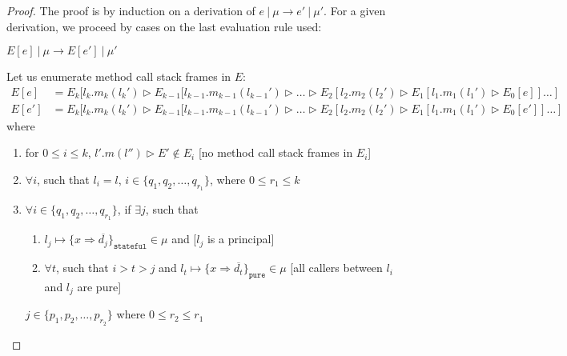 \documentclass{llncs}
\newcommand{\keywadj}[1]{\mathtt{#1}}
\newcommand{\intuition}[1]{#1}
\begin{document}
\begin{proof} The proof is by induction on a derivation of $e~|~\mu \longrightarrow e'~|~\mu'$. For a given derivation, we proceed by cases on the last evaluation rule used:\\

\sloppy

\noindent{} $E[e]~|~\mu \longrightarrow E[e']~|~\mu'$

Let us enumerate method call stack frames in $E$:
\begin{align*}
E[e] &= E_k[l_k.m_k(l_k') \rhd E_{k-1}[l_{k-1}.m_{k-1}(l_{k-1}') \rhd \dots \rhd E_2[l_2.m_2(l_2') \rhd E_1[l_1.m_1(l_1') \rhd E_0[e]] \dots ]\\
E[e'] &= E_k[l_k.m_k(l_k') \rhd E_{k-1}[l_{k-1}.m_{k-1}(l_{k-1}') \rhd \dots \rhd E_2[l_2.m_2(l_2') \rhd E_1[l_1.m_1(l_1') \rhd E_0[e']] \dots ]
\end{align*}
where
\begin{enumerate}
\item for $0 \leq i \leq k$, $l'.m(l'') \rhd E' \not\in E_i$ \intuition{\hspace{150pt} [no method call stack frames in $E_i$]}
\item $\forall i$, such that $l_i = l$, $i \in \{ q_1, q_2, \dots, q_{r_1} \}$, where $0 \leq r_1 \leq k$ \intuition{}
\item $\forall i \in \{ q_1, q_2, \dots, q_{r_1} \}$, if $\exists j$, such that
\begin{enumerate}
\item $l_j \mapsto \{ x \Rightarrow \overline{d_j} \}_{\keywadj{stateful}} \in \mu$ and \intuition{\hspace{230pt} [$l_j$ is a principal]}
\item $\forall t$, such that $i > t > j$ and $l_t \mapsto \{ x \Rightarrow \overline{d_t} \}_{\keywadj{pure}} \in \mu$ \intuition{\hspace{60pt} [all callers between $l_i$ and $l_j$ are pure]}
\end{enumerate}
$j \in \{ p_1, p_2, \dots, p_{r_2}\}$ where $0 \leq r_2 \leq r_1$
\intuition{}

\end{enumerate}
\end{proof}
\end{document}
